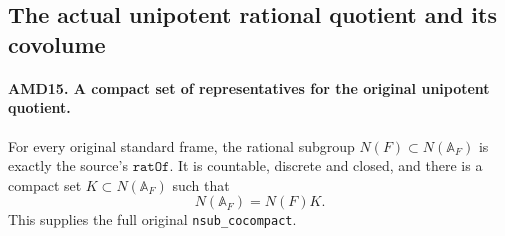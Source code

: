 \subsection{The actual unipotent rational quotient and its covolume}

\paragraph{AMD15. A compact set of representatives for the original unipotent quotient.}
\label{claim:AMD15}
For every original standard frame, the rational subgroup
\(N(F)\subset N(\mathbb A_F)\) is exactly the source's
\(\texttt{ratOf}\).  It is countable, discrete and closed,
and there is a compact set \(K\subset N(\mathbb A_F)\)
such that
\[
                    N(\mathbb A_F)=N(F)K.
 \tag{AMD.28}
\]
This supplies the full original \texttt{nsub\_cocompact}.


